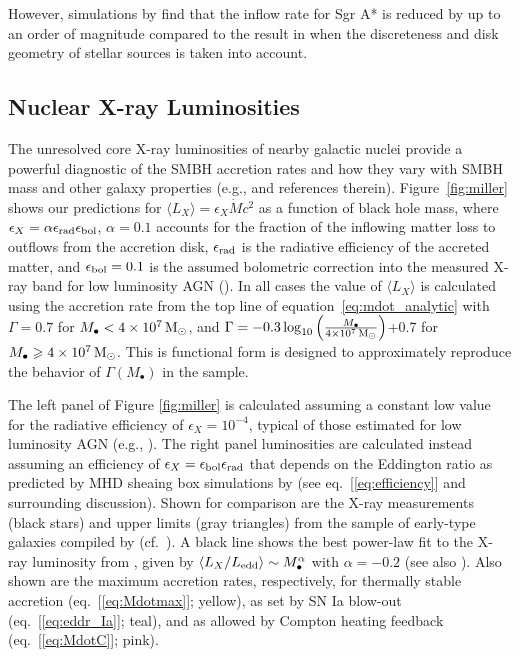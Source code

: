 \documentclass[usenatbib,fleqn]{mn2e}
\newcommand{\Mbh}[1][]{M_{\bullet#1}}
\begin{document}
However, simulations by \citet{Cuadra+2006} find that
the inflow rate for Sgr A* is reduced by up to an order of magnitude
compared to the result in \citet{Quataert:2004a} when the discreteness
and disk geometry of stellar sources is taken into account.


\subsection{Nuclear X-ray Luminosities}
\label{sec:Lx}

The unresolved core X-ray luminosities of nearby galactic nuclei
provide a powerful diagnostic of the SMBH accretion rates and how they
vary with SMBH mass and other galaxy properties (e.g., \citealt{Ho08}
and references therein).  Figure~\ref{fig:miller} shows our
predictions for $\langle L_{X} \rangle =\epsilon_X \dot{M} c^2$ as a
function of black hole mass, where $\epsilon_{X} = \alpha\epsilon_{\rm
  rad}\epsilon_{\rm bol}$, $\alpha = 0.1$ accounts for the fraction of
the inflowing matter loss to outflows from the accretion disk,
$\epsilon_{\rm rad}$ is the radiative efficiency of the accreted
matter, and $\epsilon_{\rm bol} = 0.1$ is the assumed bolometric
correction into the measured X-ray band for low luminosity AGN
(\citealt{Ho08}).  In all cases the value of $\langle L_X \rangle$ is
calculated using the accretion rate from the top line of
equation~\eqref{eq:mdot_analytic} with $\Gamma = 0.7$ for $\Mbh < 4
\times 10^7 \Msun$, and $\Gamma=-0.3 \log_{10}
\left(\frac{\Mbh}{4\times 10^7 \Msun}\right)$+0.7 for $\Mbh \geq 4
\times 10^7 \Msun$. This is functional form is designed to
approximately reproduce the behavior of $\Gamma(\Mbh)$ in the
\citet{LauerFaber+:2007a} sample.

The left panel of Figure \ref{fig:miller} is calculated assuming a
constant low value for the radiative efficiency of $\epsilon_X =
10^{-4}$, typical of those estimated for low luminosity AGN (e.g.,
\citealt{Ho:2009a}).  The right panel luminosities are calculated
instead assuming an efficiency of $\epsilon_X= \epsilon_{\rm
  bol}\epsilon_{\rm rad}$ that depends on the Eddington ratio as
predicted by MHD sheaing box simulations by \citet{Sharma+2007} (see
eq.~[\ref{eq:efficiency}] and surrounding discussion).  Shown for
comparison are the X-ray measurements (black stars) and upper limits
(gray triangles) from the sample of early-type galaxies compiled by
\citet{Miller+15} (cf.~\citealt{Gallo+10}).  A black line shows the
best power-law fit to the X-ray luminosity from \citet{Miller+15},
given by $\langle L_X/L_{\rm edd}\rangle \sim \Mbh^\alpha$ with
$\alpha = -0.2$ (see also \citealt{Zhang+09, Pellegrini10, Gallo+10}).
Also shown are the maximum accretion rates, respectively, for
thermally stable accretion (eq.~[\ref{eq:Mdotmax}]; yellow), as set by
SN Ia blow-out (eq.~[\ref{eq:eddr_Ia}]; teal), and as allowed by
Compton heating feedback (eq.~[\ref{eq:MdotC}]; pink).
\end{document}
